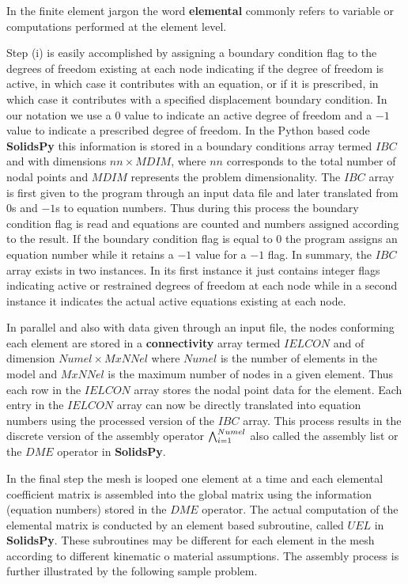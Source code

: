 \begin{tcolorbox}

In the finite element jargon the word {\bf elemental} commonly refers to variable or computations performed at the element level.

\end{tcolorbox}


Step (i) is easily accomplished by assigning a boundary condition flag to the degrees of freedom existing at each node indicating if the degree of freedom is active, in which case it contributes with an equation, or if it is prescribed, in which case it contributes with a specified displacement boundary condition. In our notation we use a $0$ value to indicate an active degree of freedom and a $-1$ value to indicate a prescribed degree of freedom. In the Python based code {\bf SolidsPy} this information is stored in a boundary conditions array termed $IBC$ and with dimensions $nn \times MDIM$, where $nn$ corresponds to the  total number of nodal points and $MDIM$ represents the problem dimensionality. The $IBC$ array is first given to the program through an input data file and later translated from $0$s and $-1$s to equation numbers. Thus during this process the boundary condition flag is read and equations are counted and numbers assigned according to the result. If the boundary condition flag is equal to $0$ the program assigns an equation number while it retains a $-1$ value for a $-1$ flag. In summary, the $IBC$ array exists in two instances. In its first instance it just contains integer flags indicating active or restrained degrees of freedom at each node while in a second instance it indicates the actual active equations existing at each node.

In parallel and also with data given through an input file, the nodes conforming each element are stored in a {\bf connectivity} array termed $IELCON$ and of dimension $Numel \times MxNNel$ where $Numel$ is the number of elements in the model and $MxNNel$ is the maximum number of nodes in a given element. Thus each row in the $IELCON$ array stores the nodal point data for the element. Each entry in the $IELCON$ array can now be directly translated into equation numbers using the processed version of the $IBC$ array. This process results in the discrete version of the assembly operator $\operatorname*{\bigwedge}_{i=1}^{Numel}$ also called the assembly list or the $DME$ operator in {\bf SolidsPy}.

In the final step the mesh is looped one element at a time and each elemental coefficient matrix is assembled into the global matrix using the information (equation numbers) stored in the $DME$ operator. The actual computation of the elemental matrix is conducted by an element based subroutine, called $UEL$ in {\bf SolidsPy}. These subroutines may be different for each element in the mesh according to different kinematic o material assumptions. The assembly process is further illustrated by the following sample problem.

